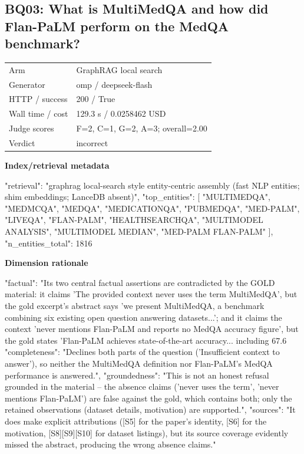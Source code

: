 \documentclass[10pt]{article}
\begin{document}
\subsection{BQ03: What is MultiMedQA and how did Flan-PaLM perform on the MedQA benchmark?}
\begin{tabular}{@{}ll@{}}
Arm & GraphRAG local search\\
Generator & omp / deepseek-flash\\
HTTP / success & 200 / True\\
Wall time / cost & 129.3 s / 0.0258462 USD\\
Judge scores & F=2, C=1, G=2, A=3; overall=2.00\\
Verdict & incorrect\\
\end{tabular}

\textbf{Index/retrieval metadata}
\begin{EvidenceText}
{
  "retrieval": "graphrag local-search style entity-centric assembly (fast NLP entities; shim embeddings; LanceDB absent)",
  "top_entities": [
    "MULTIMEDQA",
    "MEDMCQA",
    "MEDQA",
    "MEDICATIONQA",
    "PUBMEDQA",
    "MED-PALM",
    "LIVEQA",
    "FLAN-PALM",
    "HEALTHSEARCHQA",
    "MULTIMODEL ANALYSIS",
    "MULTIMODEL MEDIAN",
    "MED-PALM FLAN-PALM"
  ],
  "n_entities_total": 1816
}
\end{EvidenceText}

\textbf{Dimension rationale}
\begin{EvidenceText}
{
  "factual": "Its two central factual assertions are contradicted by the GOLD material: it claims 'The provided context never uses the term MultiMedQA', but the gold excerpt's abstract says 'we present MultiMedQA, a benchmark combining six existing open question answering datasets...'; and it claims the context 'never mentions Flan-PaLM and reports no MedQA accuracy figure', but the gold states 'Flan-PaLM achieves state-of-the-art accuracy... including 67.6%
  "completeness": "Declines both parts of the question ('Insufficient context to answer'), so neither the MultiMedQA definition nor Flan-PaLM's MedQA performance is answered.",
  "groundedness": "This is not an honest refusal grounded in the material -- the absence claims ('never uses the term', 'never mentions Flan-PaLM') are false against the gold, which contains both; only the retained observations (dataset details, motivation) are supported.",
  "sources": "It does make explicit attributions ([S5] for the paper's identity, [S6] for the motivation, [S8][S9][S10] for dataset listings), but its source coverage evidently missed the abstract, producing the wrong absence claims."
}
\end{EvidenceText}
\end{document}
